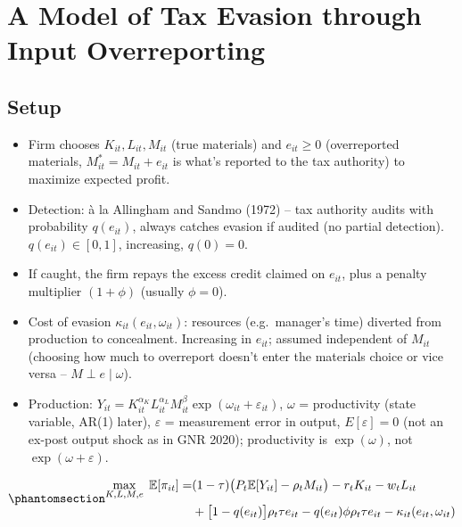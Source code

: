 \documentclass[
  12pt,
  letterpaper,
  oneside,
  openany]{report}
\providecommand{\tightlist}{%
  \setlength{\itemsep}{0pt}\setlength{\parskip}{0pt}}
\begin{document}

\chapter{A Model of Tax Evasion through Input
Overreporting}\label{sec-model}

\section{Setup}\label{setup}

\begin{itemize}
\tightlist
\item
  Firm chooses \(K_{it},L_{it},M_{it}\) (true materials) and
  \(e_{it}\ge0\) (overreported materials, \(M^*_{it}=M_{it}+e_{it}\) is
  what's reported to the tax authority) to maximize expected profit.
\item
  Detection: à la Allingham and Sandmo (1972) -- tax authority audits
  with probability \(q(e_{it})\), always catches evasion if audited (no
  partial detection). \(q(e_{it})\in[0,1]\), increasing, \(q(0)=0\).
\item
  If caught, the firm repays the excess credit claimed on \(e_{it}\),
  plus a penalty multiplier \((1+\phi)\) (usually \(\phi=0\)).
\item
  Cost of evasion \(\kappa_{it}(e_{it},\omega_{it})\): resources
  (e.g.~manager's time) diverted from production to concealment.
  Increasing in \(e_{it}\); assumed independent of \(M_{it}\) (choosing
  how much to overreport doesn't enter the materials choice or vice
  versa -- \(M\perp e\mid\omega\)).
\item
  Production:
  \(Y_{it}=K_{it}^{\alpha_K}L_{it}^{\alpha_L}M_{it}^{\beta}\exp(\omega_{it}+\varepsilon_{it})\),
  \(\omega\) = productivity (state variable, AR(1) later),
  \(\varepsilon\) = measurement error in output, \(E[\varepsilon]=0\)
  (not an ex-post output shock as in GNR 2020); productivity is
  \(\exp(\omega)\), not \(\exp(\omega+\varepsilon)\).
\end{itemize}

\begin{equation}\protect\phantomsection\label{eq-profit}{
\begin{aligned}
  \max_{K,L,M,e} \; \mathbb{E}[\pi_{it}] = &(1-\tau)\big(P_t\mathbb{E}[Y_{it}]-\rho_tM_{it}\big)-r_tK_{it}-w_tL_{it}\\
  &+\big[1-q(e_{it})\big]\rho_t\tau e_{it}-q(e_{it})\phi\rho_t\tau e_{it}-\kappa_{it}(e_{it},\omega_{it})
\end{aligned}
}\end{equation}
\end{document}
